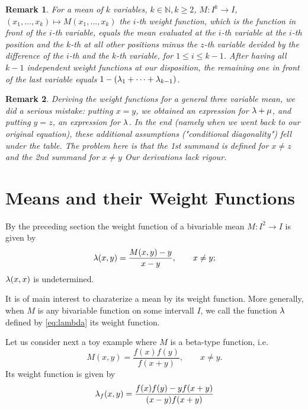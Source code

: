 \documentclass{amsart}
\makeatletter
\theoremstyle{plain}
\newtheorem{remark}{Remark}
\numberwithin{equation}{section}
\def\lambda{\Greekmath 0115 }%
\def\mu{\Greekmath 0116 }%
\def\FindBoldGroup{%
   {\setbox0=\hbox{$\mathbf{x\global\edef\theboldgroup{\the\mathgroup}}$}}%
}
\def\Greekmath#1#2#3#4{%
    \if@compatibility
        \ifnum\mathgroup=\symbold
           \mathchoice{\mbox{\boldmath$\displaystyle\mathchar"#1#2#3#4$}}%
                      {\mbox{\boldmath$\textstyle\mathchar"#1#2#3#4$}}%
                      {\mbox{\boldmath$\scriptstyle\mathchar"#1#2#3#4$}}%
                      {\mbox{\boldmath$\scriptscriptstyle\mathchar"#1#2#3#4$}}%
        \else
           \mathchar"#1#2#3#4%
        \fi 
    \else 
        \FindBoldGroup
        \ifnum\mathgroup=\theboldgroup %
           \mathchoice{\mbox{\boldmath$\displaystyle\mathchar"#1#2#3#4$}}%
                      {\mbox{\boldmath$\textstyle\mathchar"#1#2#3#4$}}%
                      {\mbox{\boldmath$\scriptstyle\mathchar"#1#2#3#4$}}%
                      {\mbox{\boldmath$\scriptscriptstyle\mathchar"#1#2#3#4$}}%
        \else
           \mathchar"#1#2#3#4%
        \fi     	    
	  \fi}
\newcommand{\N}{{\mathbb{N}}}
\makeatother
\begin{document}
\begin{remark}
	For a mean of $k$ variables, $k \in \N, k \geq 2$, $M: I^k \to I$, $(x_1, \ldots, x_k) \mapsto M(x_1, \ldots, x_k)$ 
	the $i$-th weight function, which is the function in front of the $i$-th variable, 
	equals the mean evaluated at the $i$-th variable at the $i$-th position and the $k$-th at all other positions minus the $z$-th variable devided by the difference of the $i$-th and the $k$-th variable, for $1 \leq i \leq k-1$.
    After having all $k-1$ independent weight functions at our disposition, the remaining one in front of the last variable equals $1-(\lambda_1+ \cdots +\lambda_{k-1})$.	
   
\end{remark}

\begin{remark}
    Deriving the weight functions for a general three variable mean, 
    we did a serious mistake:
    putting $x=y$, we obtained an expression for $\lambda + \mu$,
    and putting $y=z$, an expression for $\lambda$.
    In the end (namely when we went back to our original equation), 
    these additional assumptions ("conditional diagonality") fell under the table.
    The problem here is that the 1st summand is defined for 
    $x \neq z$ and the 2nd summand for $x \neq y$
    Our derivations lack rigour.
    \end{remark}

\section{Means and their Weight Functions}
By the preceding section the weight function of a bivariable mean $M:I^2 \to I$ is given by
\begin{equation}
	\lambda (x,y) =
	\frac{M(x,y)-y}{x-y}, \qquad x \neq y;
	\label{eq:lambda}
\end{equation}
$\lambda (x,x)$ is undetermined.

It is of main interest to charaterize a mean by its weight function.
More generally, when $M$ is any bivariable function on some intervall $I$,
we call the function $\lambda$ defined by \eqref{eq:lambda} its weight function.

Let us consider next a toy example where $M$ is a beta-type function, i.e.
\begin{equation*}
	M(x,y) =
	\frac{f(x)f(y)}{f(x+y)}, \qquad x \neq y.
\end{equation*}
Its weight function is given by
\begin{equation*}
\lambda_f (x,y)=\frac{f(x) f(y)-y f(x+y)}{(x-y) f(x+y)}	
\end{equation*}
\end{document}
